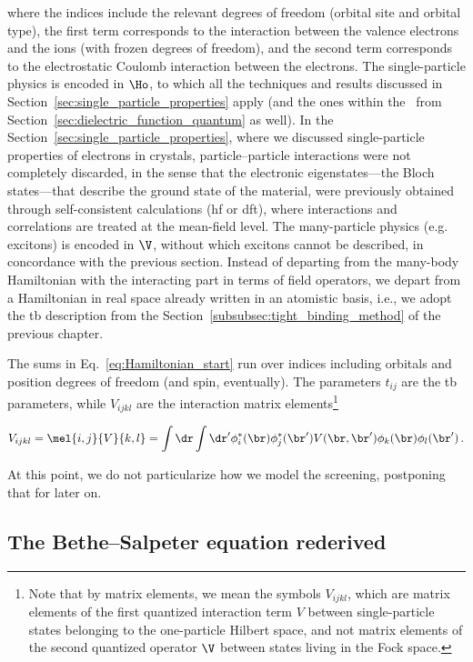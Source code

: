 \noindent where the indices include the relevant degrees of freedom (orbital site and orbital type), the first term corresponds to the interaction between the valence electrons and the ions (with frozen degrees of freedom), and the second term corresponds to the electrostatic Coulomb interaction between the electrons.
The single-particle physics is encoded in $\Ho$, to which all the techniques and results discussed in Section~\ref{sec:single_particle_properties} apply (and the ones within the \rpa~from Section~\ref{sec:dielectric_function_quantum} as well).
In the Section~\ref{sec:single_particle_properties}, where we discussed single-particle properties of electrons in crystals,  particle--particle interactions were not completely discarded, in the sense that the electronic eigenstates---the Bloch states---that describe the ground state of the material, were previously obtained through self-consistent calculations (\gls{hf} or \gls{dft}), where interactions and correlations are treated at the mean-field level.
The many-particle physics (e.g. excitons) is encoded in $\V$, without which excitons cannot be described, in concordance with the previous section.
Instead of departing from the many-body Hamiltonian with the interacting part in terms of field operators, we depart from a Hamiltonian in real space already written in an atomistic basis, i.e., we adopt the \gls{tb} description from the Section~\ref{subsubsec:tight_binding_method} of the previous chapter.

The sums in Eq.~\eqref{eq:Hamiltonian_start} run over indices including orbitals and position degrees of freedom (and spin, eventually).
The parameters $t_{i j}$ are the \gls{tb} parameters, while $V_{ijkl}$ are the interaction matrix elements\footnote{Note that by matrix elements, we mean the symbols $V_{ijkl}$, which are matrix elements of the first quantized interaction term $V$ between single-particle states belonging to the one-particle Hilbert space, and not matrix elements of the second quantized operator $\V$ between states living in the Fock space.}

\begin{equation}
    V_{ijkl} = \mel{i,j}{V}{k,l} = \int \dr \int \dr' \phi^*_i(\br) \phi^*_j(\br') V(\br,\br') \phi_k(\br) \phi_l(\br')\,.
\end{equation}

\noindent At this point, we do not particularize how we model the screening, postponing that for later on.

\subsection{The Bethe--Salpeter equation rederived}
\label{subsec:BSE_rederived}

